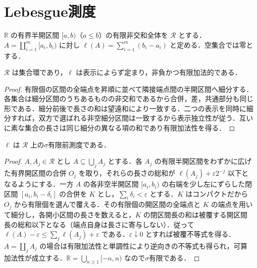 \section{Lebesgue測度}
\begin{defn}[半開区間環と区間長]
$\mathbb R$ の有界半開区間 $[a,b)$（$a\leq b$）の有限非交和全体を $\mathcal R$ とする．$A=\coprod_{i=1}^m[a_i,b_i)$ に対し $\ell(A)=\sum_{i=1}^m(b_i-a_i)$ と定める．空集合では零とする．
\end{defn}
\begin{prop}[区間長の整合性と有限加法性]
$\mathcal R$ は集合環であり，$\ell$ は表示によらず定まり，非負かつ有限加法的である．
\end{prop}
\begin{proof}
有限個の区間の全端点を昇順に並べて隣接端点間の半開区間へ細分する．各集合は細分区間のうちあるものの非交和であるから合併，差，共通部分も同じ形である．細分前後で長さの和は望遠和により一致する．二つの表示を同時に細分すれば，双方で選ばれる非空細分区間は一致するから表示独立性が従う．互いに素な集合の長さは同じ細分の異なる項の和であり有限加法性を得る．
\end{proof}
\begin{prop}[区間長の前測度性]
$\ell$ は $\mathcal R$ 上の$\sigma$有限前測度である．
\end{prop}
\begin{proof}
$A,A_j\in\mathcal R$ とし $A\subseteq\bigcup_j A_j$ とする．各 $A_j$ の有限半開区間をわずかに広げた有界開区間の合併 $O_j$ を取り，それらの長さの総和が $\ell(A_j)+\varepsilon2^{-j}$ 以下となるようにする．一方 $A$ の各非空半開区間 $[a_i,b_i)$ の右端を少し左にずらした閉区間 $[a_i,b_i-\delta_i]$ の合併を $K$ とし，$\sum_i\delta_i<\varepsilon$ とする．$K$ はコンパクトだから $O_j$ から有限個を選んで覆える．その有限個の開区間の全端点と $K$ の端点を用いて細分し，各開小区間の長さを数えると，$K$ の閉区間長の和は被覆する開区間長の総和以下となる（端点自身は長さに寄与しない）．従って $\ell(A)-\varepsilon\leq\sum_j\ell(A_j)+\varepsilon$ である．$\varepsilon\downarrow0$ とすれば被覆不等式を得る．$A=\coprod_j A_j$ の場合は有限加法性と単調性により逆向きの不等式も得られ，可算加法性が成立する．$\mathbb R=\bigcup_{n\geq1}[-n,n)$ なので$\sigma$有限である．
\end{proof}
